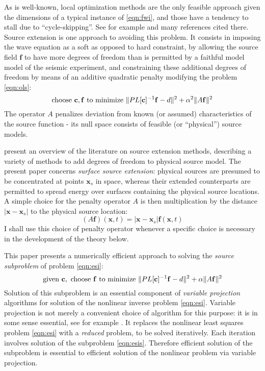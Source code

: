 \documentclass[georeport,12pt]{geophysics}
\newcommand{\bx}{\mathbf{x}}
\newcommand{\bff}{\mathbf{f}}
\begin{document}
As is well-known, local optimization methods are the only feasible
approach given the dimensions of a typical instance of \ref{eqn:fwi},
and those have a tendency to stall due to ``cycle-skipping''. See for
example \cite{VirieuxOperto:09} and many references cited there. Source
extension is one approach to avoiding this problem. It consists in
imposing the wave equation as a soft as opposed to hard constraint, by
allowing the source field $\bff$ to have more degrees of freedom than
is permitted by a faithful model model of the seismic experiment, and
constraining these additional degrees of freedom by means of an
additive quadratic penalty modifying the problem \ref{eqn:ols}:
\begin{equation}
\label{eqn:esi}
\mbox{choose } {\bf c}, \bff \mbox{ to minimize } \|PL[{\bf c}]^{-1}\bff -d \|^2 + \alpha^2 \|A\bff\|^2 
\end{equation}
The operator $A$ penalizes deviation from known (or assumed)
characteristics of the source function - its null space consists of
feasible (or ``physical'') source models.

\cite{HuangNammourSymesDollizal:SEG19} present an overview of the
literature on source extension methods, describing a variety of
methods to add degrees of freedom to physical source model. The present paper
concerns {\em surface source extension}: physical sources are
presumed to be concentrated at points $\bx_s$ in space, whereas their extended
counterparts are permitted to spread energy over surfaces containing
the physical source locations. A simple choice for the penalty
operator $A$ is then multiplication by the distance $|\bx-\bx_s|$ to the physical
source location:
\begin{equation}
  \label{eqn:penop}
  (A\bff)(\bx,t) = |\bx-\bx_s|\bff(\bx,t)
\end{equation}
I shall use this choice of penalty operator whenever a specific choice
is necessary in the development of the theory below.

This paper presents a numerically efficient approach to solving the
{\em source subproblem} of problem \ref{eqn:esi}:
\begin{equation}
\label{eqn:esis}
\mbox{given } {\bf c}, \mbox{ choose } \bff \mbox{ to minimize }
\|PL[{\bf c}]^{-1}\bff -d \|^2 + \alpha \|A\bff\|^2 
\end{equation}
Solution of this subproblem is an essential component of {\em variable
  projection} algorithms for solution of the nonlinear inverse problem
\ref{eqn:esi}. Variable projection is not merely a convenient choice
of algorithm for this purpose: it is in some sense essential, see for
example \cite{Symes:SEG20}. It replaces the nonlinear
least squares problem \ref{eqn:esi} with a {\em reduced} problem, to
be solved iteratively. Each iteration involves solution of the
subproblem \ref{eqn:esis}. Therefore efficient solution of the
subproblem is essential to efficient solution of the nonlinear problem
via variable projection.
\end{document}
